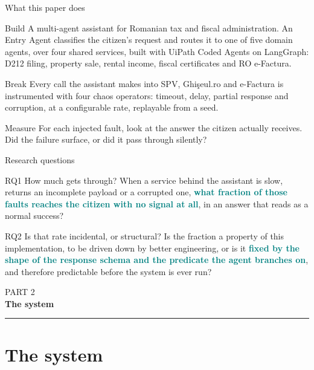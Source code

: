 \documentclass[aspectratio=169,10pt]{beamer}
\newcommand{\hl}[1]{\textcolor{teal}{\textbf{#1}}}      %
\newcommand{\keypart}[2]{%
  \begin{frame}[plain, noframenumbering]
    \vfill
    \centering
    {\color{stone}\small #1}\\[0.35em]
    {\color{teal}\Large\bfseries #2}\\[0.9em]
    {\color{rust}\rule{0.25\paperwidth}{1.2pt}}
    \vfill\vfill
  \end{frame}%
}
\begin{document}
\begin{frame}{What this paper does}
  \begin{block}{Build}
    \small A multi-agent assistant for Romanian tax and fiscal administration. An Entry Agent
    classifies the citizen's request and routes it to one of five domain agents, over four
    shared services, built with UiPath Coded Agents on LangGraph: D212 filing, property sale,
    rental income, fiscal certificates and RO e-Factura.
  \end{block}
  \begin{block}{Break}
    \small Every call the assistant makes into SPV, Ghi\c{s}eul.ro and e-Factura is instrumented
    with four chaos operators: timeout, delay, partial response and corruption, at a
    configurable rate, replayable from a seed.
  \end{block}
  \begin{block}{Measure}
    \small For each injected fault, look at the answer the citizen actually receives. Did the
    failure surface, or did it pass through silently?
  \end{block}
\end{frame}

\begin{frame}{Research questions}
  \begin{block}{RQ1 \quad How much gets through?}
    When a service behind the assistant is slow, returns an incomplete payload or a corrupted
    one, \hl{what fraction of those faults reaches the citizen with no signal at all}, in an
    answer that reads as a normal success?
  \end{block}
  \vfill
  \begin{block}{RQ2 \quad Is that rate incidental, or structural?}
    Is the fraction a property of this implementation, to be driven down by better engineering,
    or is it \hl{fixed by the shape of the response schema and the predicate the agent branches
    on}, and therefore predictable before the system is ever run?
  \end{block}
\end{frame}

\keypart{PART 2}{The system}
\section{The system}
\end{document}

